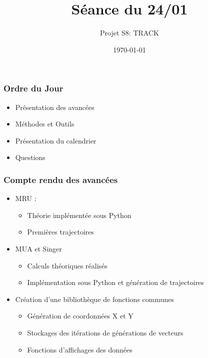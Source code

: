 \documentclass{beamer}
\title{Séance du 24/01}
\author{Projet S8: TRACK}
\institute[T2, Enseirb-Matmeca]{Département Télécommunication\\Enseirb-Matmeca, Bordeaux}
\date{\today}
\begin{document}
\begin{frame}
  \titlepage
\end{frame}

\begin{frame}
  \frametitle{Ordre du Jour}
  \begin{itemize}
    \item Présentation des avancées
    \item Méthodes et Outils
    \item Présentation du calendrier
    \item Questions 
  \end{itemize}
\end{frame}

\begin{frame}
  \frametitle{Compte rendu des avancées}
  \begin{itemize}
    \item MRU :
    \begin{itemize}
        \item[\hspace{1cm}] Théorie implémentée sous Python
        \item[\hspace{1cm}] Premières trajectoires 
    \end{itemize}
    \item MUA et Singer
    \begin{itemize}
        \item[\hspace{1cm}] Calculs théoriques réalisés
        \item[\hspace{1cm}] Implémentation sous Python et génération de trajectoires
    \end{itemize}
    \item Création d'une bibliothèque de fonctions communes
    \begin{itemize}
        \item[\hspace{1cm}] Génération de coordonnées X et Y
        \item[\hspace{1cm}] Stockages des itérations de générations de vecteurs
        \item[\hspace{1cm}] Fonctions d'affichages des données
    \end{itemize}
  \end{itemize}
\end{frame}
\end{document}
